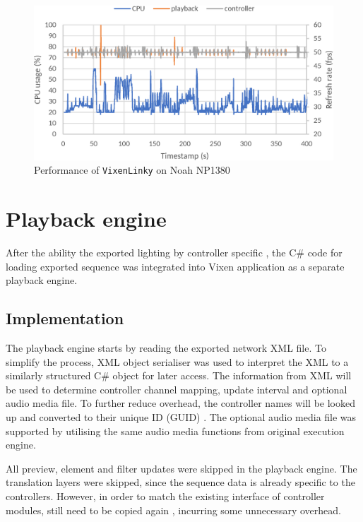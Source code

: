 \begin{figure}[!t]
  \centering
  \includegraphics[width=0.8\columnwidth]{Figs/vixenlinky_noah.eps}
  \caption{\footnotesize Performance of \texttt{VixenLinky} on Noah NP1380}
  \label{fig:vixenlinky_noah}
\end{figure}

\section{Playback engine}

After  the ability  the exported lighting  by controller specific , the C\# code for loading exported sequence  was integrated into Vixen application as a separate playback engine.

\subsection{Implementation}

The playback engine starts by reading the exported network XML file. To simplify the process,  XML object serialiser was used to interpret  the XML  to a similarly structured C\# object for later access. The information  from XML will be used to determine controller channel mapping, update interval and optional audio media file. To further reduce  overhead, the controller names will be looked up and converted to their unique ID (GUID) . The optional audio media file was supported by utilising the same audio media functions from  original execution engine.

All preview, element and filter updates were skipped in the playback engine. The translation layers were skipped, since the sequence data is already specific to the controllers. However, in order to match the existing interface of controller modules,  still need to be copied again , incurring some unnecessary overhead.

